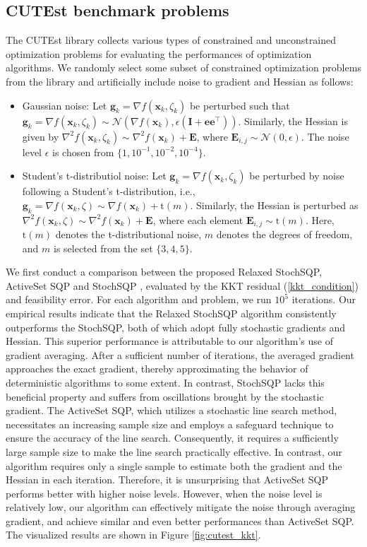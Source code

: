 \documentclass[aos]{imsart}
\numberwithin{equation}{section}
\theoremstyle{plain}
\begin{document}
\subsection{CUTEst benchmark problems}
The CUTEst library collects various types of constrained and unconstrained optimization problems for evaluating the performances of optimization algorithms. We randomly select some subset of constrained optimization problems from the library and artificially include noise to gradient and Hessian as follows:
\begin{itemize}
    \item Gaussian noise: Let $\bm{g}_k = \nabla f(\bm{x}_k, \zeta_k)$ be perturbed such that $\bm{g}_k = \nabla f(\bm{x}_k, \zeta_k) \sim \mathcal{N}(\nabla f(\bm{x}_k), \epsilon (\bm{I} + \bm{e} \bm{e}^{\top}))$. Similarly, the Hessian is given by $\nabla^2 f(\bm{x}_{k}, \zeta_k) \sim \nabla^2 f(\bm{x}_{k}) + \bm{E}$, where $\bm{E}_{i,j} \sim \mathcal{N}(0, \epsilon)$. The noise level $\epsilon$ is chosen from $\{1, 10^{-1}, 10^{-2}, 10^{-4} \}$. 

    \item Student's t-distributiol noise: 
    Let $\bm{g}_k = \nabla f(\bm{x}_k, \zeta_k)$ be perturbed by noise following a Student's t-distribution, i.e., $\bm{g}_k = \nabla f(\bm{x}_k, \zeta) \sim \nabla f(\bm{x}_k) + \text{t}(m)$. Similarly, the Hessian is perturbed as $\nabla^2 f(\bm{x}_{k}, \zeta) \sim \nabla^2 f(\bm{x}_{k}) + \bm{E}$, where each element $\bm{E}_{i,j} \sim \text{t}(m)$. Here, $\text{t}(m)$ denotes the t-distributional noise, $m$ denotes the degrees of freedom, and $m$ is selected from the set $\{3, 4, 5\}$.
\end{itemize}
We first conduct a comparison between the proposed Relaxed StochSQP, ActiveSet SQP \cite{na2023inequality} and StochSQP \cite{curtis2023sequential}, evaluated by the KKT residual (\ref{kkt_condition}) and feasibility error. For each algorithm and problem, we run $10^5$ iterations. Our empirical results indicate that the Relaxed StochSQP algorithm consistently outperforms the StochSQP, both of which adopt fully stochastic gradients and Hessian. This superior performance is attributable to our algorithm's use of gradient averaging. After a sufficient number of iterations, the averaged gradient approaches the exact gradient, thereby approximating the behavior of deterministic algorithms to some extent. In contrast, StochSQP lacks this beneficial property and suffers from oscillations brought by the stochastic gradient. The ActiveSet SQP, which utilizes a stochastic line search method, necessitates an increasing sample size and employs a safeguard technique to ensure the accuracy of the line search. Consequently, it requires a sufficiently large sample size to make the line search practically effective. In contrast, our algorithm requires only a single sample to estimate both the gradient and the Hessian in each iteration.
Therefore, it is unsurprising that ActiveSet SQP performs better with higher noise levels. However, when the noise level is relatively low, our algorithm can effectively mitigate the noise through averaging gradient, and achieve similar and even better performances than ActiveSet SQP. The visualized results are shown in Figure \ref{fig:cutest_kkt}.
\end{document}
